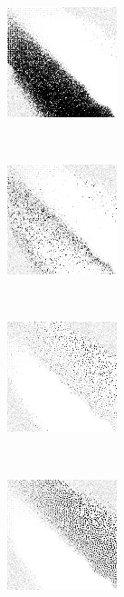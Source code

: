 
\begin{figure}
\center

	\begin{subfigure}[t]{0.22\textwidth}
		\center
		\includegraphics[width=\stratgraphwidth]{images/findings/experiments/neighbors/strats/hand_max_min.png}
		\caption{\handmaxmin}
	\end{subfigure}
	~
	\begin{subfigure}[t]{0.22\textwidth}
		\center
		\includegraphics[width=\stratgraphwidth]{images/findings/experiments/neighbors/strats/hand_max_avg.png}
		\caption{\handmaxavg}
	\end{subfigure}
~
	\begin{subfigure}[t]{0.22\textwidth}
		\center
		\includegraphics[width=\stratgraphwidth]{images/findings/experiments/neighbors/strats/hand_max_med.png}
		\caption{\handmaxmed}
	\end{subfigure}
	~
	\begin{subfigure}[t]{0.22\textwidth}
		\center
		\includegraphics[width=\stratgraphwidth]{images/findings/experiments/neighbors/strats/hand_max_poss.png}
		\caption{\handmaxposs}
	\end{subfigure}


\end{figure}
